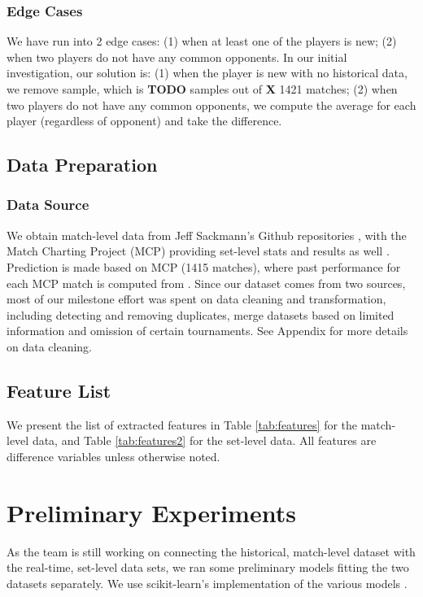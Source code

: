 \documentclass[paper=a4, fontsize=11pt]{scrartcl} %
\numberwithin{equation}{section} %
\numberwithin{figure}{section} %
\numberwithin{table}{section} %
\begin{document}
\subsubsection{Edge Cases}
We have run into 2 edge cases: (1) when at least one of the players is new; (2) when two players do not have any common opponents.  In our initial investigation, our solution is: (1) when the player is new with no historical data, we remove sample, which is \textbf{TODO} samples out of \textbf{X} 1421 matches; (2) when two players do not have any common opponents, we compute the average for each player (regardless of opponent) and take the difference.
\subsection{Data Preparation}
\subsubsection{Data Source}
We obtain match-level data from Jeff Sackmann's Github repositories \cite{tennis_atp} \cite{tennis_charting}, with the Match Charting Project (MCP) providing set-level stats and results as well \cite{tennis_charting}. Prediction is made based on MCP (1415 matches), where past performance for each MCP match is computed from \cite{tennis_atp}. Since our dataset comes from two sources, most of our milestone effort was spent on data cleaning and transformation, including detecting and removing duplicates, merge datasets based on limited information and omission of certain tournaments.  See Appendix for more details on data cleaning.
\subsection{Feature List}
We present the list of extracted features in Table \ref{tab:features} for the match-level data, and Table \ref{tab:features2} for the set-level data.  All features are difference variables unless otherwise noted. 



\section{Preliminary Experiments}
As the team is still working on connecting the historical, match-level dataset with the real-time, set-level data sets, we ran some preliminary models fitting the two datasets separately. We use scikit-learn's implementation of the various models \cite{scikit-learn}.
\end{document}
